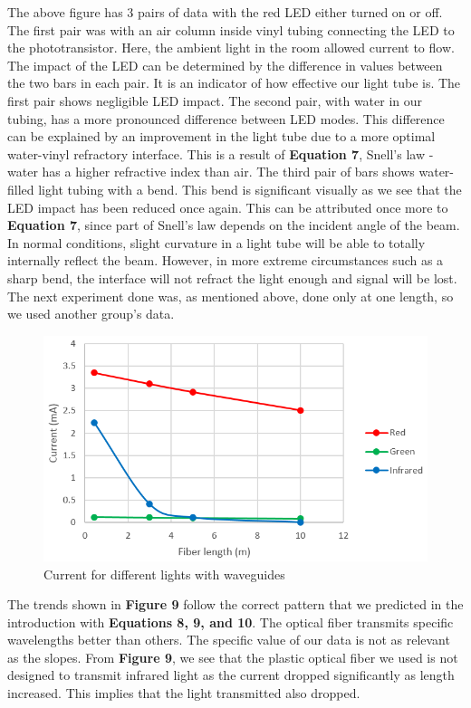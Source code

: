 \documentclass{article}
\begin{document}
The above figure has 3 pairs of data with the red LED either turned on or off. The first pair was with an air column inside vinyl tubing connecting the LED to the phototransistor. Here, the ambient light in the room allowed current to flow. The impact of the LED can be determined by the difference in values between the two bars in each pair. It is an indicator of how effective our light tube is. The first pair shows negligible LED impact. The second pair, with water in our tubing, has a more pronounced difference between LED modes. This difference can be explained by an improvement in the light tube due to a more optimal water-vinyl refractory interface. This is a result of \textbf{Equation 7}, Snell's law - water has a higher refractive index than air. The third pair of bars shows water-filled light tubing with a bend. This bend is significant visually as we see that the LED impact has been reduced once again. This can be attributed once more to \textbf{Equation 7}, since part of Snell's law depends on the incident angle of the beam. In normal conditions, slight curvature in a light tube will be able to totally internally reflect the beam. However, in more extreme circumstances such as a sharp bend, the interface will not refract the light enough and signal will be lost. The next experiment done was, as mentioned above, done only at one length, so we used another group's data.

\begin{figure}[h!]
	\centering
	\includegraphics[scale=0.77]{2c.png}
	\caption{Current for different lights with waveguides}
\end{figure}

The trends shown in \textbf{Figure 9} follow the correct pattern that we predicted in the introduction with \textbf{Equations 8, 9, and 10}. The optical fiber transmits specific wavelengths better than others. The specific value of our data is not as relevant as the slopes. From \textbf{Figure 9}, we see that the plastic optical fiber we used is not designed to transmit infrared light as the current dropped significantly as length increased. This implies that the light transmitted also dropped.\\
\end{document}
